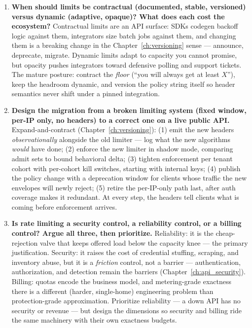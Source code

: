 \begin{enumerate}[label=\textbf{Q\arabic*.}, leftmargin=1.6cm, start=31]
        degrades to $R \times N/R = N$ \emph{per unsynced window} plus the
        drift term. Defense: the bound is honest, tunable (shrink $\Delta$,
        over-divide $N$), and failure-safe (a dead replica's share is
        lost, not stolen). Attack: under targeted abuse the attacker routes
        around awareness, so exactness-critical surfaces must not use it.
        Both are correct; that is the point of publishing the bound.
  \item \textbf{When should limits be contractual (documented, stable,
        versioned) versus dynamic (adaptive, opaque)? What does each cost
        the ecosystem?}
        Contractual limits are an API surface: SDKs codegen backoff logic
        against them, integrators size batch jobs against them, and
        changing them is a breaking change in the Chapter~\ref{ch:versioning}
        sense --- announce, deprecate, migrate. Dynamic limits adapt to
        capacity you cannot promise, but opacity pushes integrators toward
        defensive polling and support tickets. The mature posture: contract
        the \emph{floor} (``you will always get at least $X$''), keep the
        headroom dynamic, and version the policy string itself so header
        semantics never shift under a pinned integration.
  \item \textbf{Design the migration from a broken limiting system
        (fixed window, per-IP only, no headers) to a correct one on a live
        public API.}
        Expand-and-contract (Chapter~\ref{ch:versioning}): (1) emit the new
        headers \emph{observationally} alongside the old limiter --- log
        what the new algorithms \emph{would} have done; (2) enforce the new
        limiter in shadow mode, comparing admit sets to bound behavioral
        delta; (3) tighten enforcement per tenant cohort with per-cohort
        kill switches, starting with internal keys; (4) publish the policy
        change with a deprecation window for clients whose traffic the new
        envelopes will newly reject; (5) retire the per-IP-only path last,
        after auth coverage makes it redundant. At every step, the headers
        tell clients what is coming before enforcement arrives.
  \item \textbf{Is rate limiting a security control, a reliability control,
        or a billing control? Argue all three, then prioritize.}
        Reliability: it is the cheap-rejection valve that keeps offered
        load below the capacity knee --- the primary justification.
        Security: it raises the cost of credential stuffing, scraping, and
        inventory abuse, but it is a \emph{friction} control, not a
        barrier --- authentication, authorization, and detection remain the
        barriers (Chapter~\ref{ch:api_security}). Billing: quotas encode
        the business model, and metering-grade exactness there is a
        different (harder, single-home) engineering problem than
        protection-grade approximation. Prioritize reliability ---
        a down API has no security or revenue --- but design the dimensions
        so security and billing ride the same machinery with their own
        exactness budgets.
\end{enumerate}
